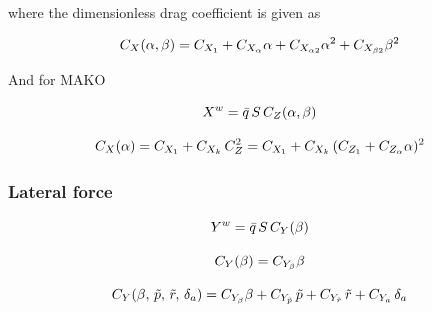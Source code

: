 where the dimensionless drag coefficient is given as



\begin{equation}{\label{eqn:dragCoeffETHcraft}}
C_X(\alpha, \beta) = C_{X_1} + C_{X_{\alpha}} \alpha + C_{X_{\alpha 2}} {\alpha}^2 + C_{X_{\beta 2}} {\beta}^2 
\end{equation}

And for MAKO \cite{bronz2016aerodynamic}

\begin{equation}{\label{eqn:dragForceMAKO}}
X^w = \bar{q} \, S \, C_{Z}(\alpha, \beta)
\end{equation}

\begin{equation}{\label{eqn:dragCoeffMAKO}}
C_X(\alpha) = C_{X_1} + C_{X_k} \, C_Z^2 = C_{X_1} + C_{X_k} \, (C_{Z_1} + C_{Z_{\alpha}} \alpha )^2
\end{equation}


\subsubsection{Lateral force}

\begin{equation}{\label{eqn:lateralForceETHcraft}}
Y^w = \bar{q} \, S \,  C_Y(\beta)
\end{equation}

\begin{equation}{\label{eqn:lateralCoeffETHcraft}}
C_Y(\beta) = C_{Y_\beta} \beta
\end{equation}

\begin{equation}{\label{eqn:lateralCoeffMAKO}}
C_Y(\beta, \, \tilde{p}, \, \tilde{r}, \, \delta_a) = C_{Y_\beta} \beta + C_{Y_{\tilde{p}}} \, \tilde{p} + C_{Y_{\tilde{r}}} \, \tilde{r} + C_{Y_a} \, \delta_a 
\end{equation}

